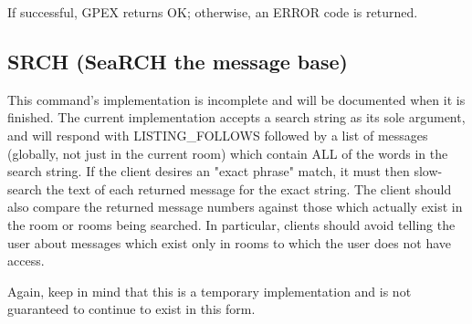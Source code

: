  If successful, GPEX returns OK; otherwise, an ERROR code is returned.



\subsection{SRCH (SeaRCH the message base)}

 This command's implementation is incomplete and will be documented when it
is finished.  The current implementation accepts a search string as its sole
argument, and will respond with LISTING_FOLLOWS followed by a list of
messages (globally, not just in the current room) which contain ALL of the
words in the search string.  If the client desires an "exact phrase" match,
it must then slow-search the text of each returned message for the exact
string.  The client should also compare the returned message numbers against
those which actually exist in the room or rooms being searched.  In
particular, clients should avoid telling the user about messages which exist
only in rooms to which the user does not have access.

 Again, keep in mind that this is a temporary implementation and is not
guaranteed to continue to exist in this form.


